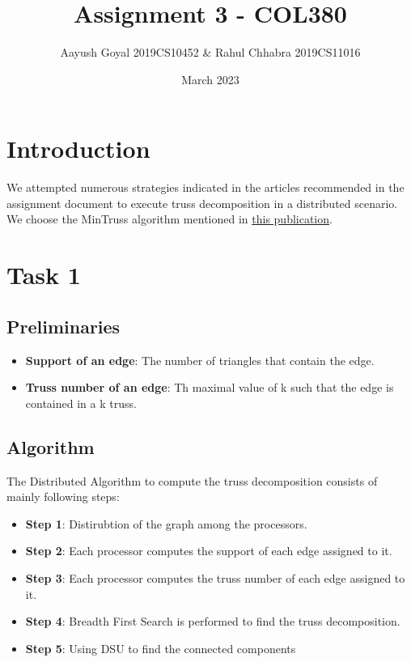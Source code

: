 \documentclass{article}
\title{Assignment 3 - COL380}
\author{Aayush Goyal 2019CS10452 & Rahul Chhabra 2019CS11016}
\date{March 2023}
\begin{document}
\maketitle

\tableofcontents


\section{Introduction}
We attempted numerous strategies indicated in the articles recommended in the assignment document to execute truss decomposition in a distributed scenario. We choose the MinTruss algorithm mentioned in \href{https://link.springer.com/chapter/10.1007/978-3-319-96983-1_50}{this publication}.

\section{Task 1}
\subsection{Preliminaries}
\begin{itemize}
    \item \textbf{Support of an edge}: The number of triangles that contain the edge.
    \item \textbf{Truss number of an edge}: Th maximal value of k such that the edge is contained in a k truss.
\end{itemize}

\subsection{Algorithm}

The Distributed Algorithm to compute the truss decomposition consists of mainly following steps:
\begin{itemize}
    \item \textbf{Step 1}: Distirubtion of the graph among the processors.
    \item \textbf{Step 2}: Each processor computes the support of each edge assigned to it.
    \item \textbf{Step 3}: Each processor computes the truss number of each edge assigned to it.
    \item \textbf{Step 4}: Breadth First Search is performed to find the truss decomposition.
    \item \textbf{Step 5}: Using DSU to find the connected components
\end{itemize}
\end{document}
